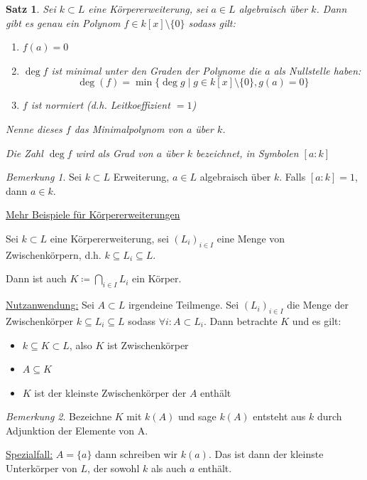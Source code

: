 \documentclass[a4paper,12pt,numbers=noenddot,parskip=full]{scrartcl}
\newcommand{\heading}{\underline}
\theoremstyle{dotless}
\newtheorem{theorem}{Satz}[section]
\theoremstyle{remark}
\newtheorem*{remark}{Bemerkung}
\begin{document}
	\begin{theorem}
		Sei $k \subset L$ eine Körpererweiterung, sei $a \in L$ algebraisch über $k$. Dann gibt es genau ein Polynom $f \in k[x] \setminus \{ 0 \}$ sodass gilt:
		\begin{enumerate}
			\item $f(a) = 0$
			\item $\deg f$ ist minimal unter den Graden der Polynome die $a$ als Nullstelle haben:
			\begin{equation*}
				\deg (f) = \min \{ \deg g \mid g \in k[x] \setminus \{0 \}, g(a) = 0 \}
			\end{equation*}
			\item $f$ ist normiert (d.h. Leitkoeffizient $= 1$)
		\end{enumerate}
		Nenne dieses $f$ das Minimalpolynom von $a$ über $k$.
		
		Die Zahl $\deg f$ wird als Grad von $a$ über $k$ bezeichnet, in Symbolen $[a: k]$
	\end{theorem}

	\begin{remark}
		Sei $k \subset L$ Erweiterung, $a \in L$ algebraisch über $k$. Falls $[a:k] = 1$, dann $a \in k$.
	\end{remark}

	\heading{Mehr Beispiele für Körpererweiterungen}
	
	Sei $k \subset L$ eine Körpererweiterung, sei $(L_i)_{i \in I}$ eine Menge von Zwischenkörpern, d.h. $k \subseteq L_i \subseteq L$.
	
	Dann ist auch $K \coloneqq \bigcap_{i \in I} L_i$ ein Körper.
	
	\heading{Nutzanwendung:} Sei $A \subset L$ irgendeine Teilmenge. Sei $(L_i)_{i \in I}$ die Menge der Zwischenkörper $k \subseteq L_i \subseteq L$ sodass $\forall i: A \subset L_i$. Dann betrachte $K$ und es gilt:
	\begin{itemize}
		\item $k \subseteq K \subset L$, also $K$ ist Zwischenkörper
		\item $A \subseteq K$
		\item $K$ ist der kleinste Zwischenkörper der $A$ enthält
	\end{itemize}

	\begin{remark}
		Bezeichne $K$ mit $k(A)$ und sage $k(A)$ entsteht aus $k$ durch Adjunktion der Elemente von A.
	\end{remark}

	\heading{Spezialfall:} $A = \{ a \}$ dann schreiben wir $k(a)$. Das ist dann der kleinste Unterkörper von $L$, der sowohl $k$ als auch $a$ enthält.
	
\end{document}
